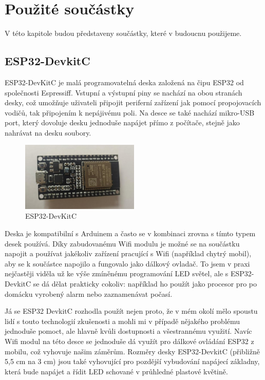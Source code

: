\chapter{Použité součástky}
V této kapitole budou představeny součástky, které v budoucnu použijeme.

\section{ESP32-DevkitC}
ESP32-DevKitC je malá programovatelná deska založená na čipu ESP32 od společnosti Espressiff. Vstupní a výstupní piny se nachází na obou stranách desky, což umožňuje uživateli připojit periferní zařízení jak pomocí propojovacích vodičů, tak připojením k nepájivému poli. Na desce se také nachází mikro-USB port, který dovoluje  desku jednoduše napájet přímo z počítače, stejně jako nahrávat na desku soubory. 

\begin{figure}[htbp]
	\centering
	\includegraphics[width=0.5\textwidth]{img/ESPDevKit3.jpg}
	\caption{ESP32-DevKitC}
\end{figure}

Deska je kompatibilní s Arduinem a často se v kombinaci zrovna s tímto typem desek používá. Díky zabudovanému Wifi modulu je možné se na součástku napojit a používat jakékoliv zařízení pracující s Wifi (například chytrý mobil), aby se k součástce napojilo a fungovalo jako dálkový ovladač. To jsem v praxi nejčastěji viděla už ke výše zmíněnému programování LED světel, ale s  ESP32-DevkitC se dá dělat prakticky cokoliv: například ho použít jako procesor pro po domácku vyrobený alarm nebo zaznamenávat počasí. 


Já se ESP32 DevkitC rozhodla použít nejen proto, že v mém okolí mělo spoustu lidí s touto technologií zkušenosti a mohli mi v případě nějakého problému jednoduše pomoct, ale hlavně kvůli dostupnosti a všestrannému využití. Navíc Wifi modul na této desce se jednoduše dá využít pro dálkové ovládání ESP32 z mobilu, což vyhovuje našim záměrům. Rozměry desky ESP32-DevkitC (přibližně 5,5 cm na 3 cm) jsou také vyhovující pro pozdější vybudování napájecí základny, která bude napájet a řídit LED schované v průhledné plastové květině.



